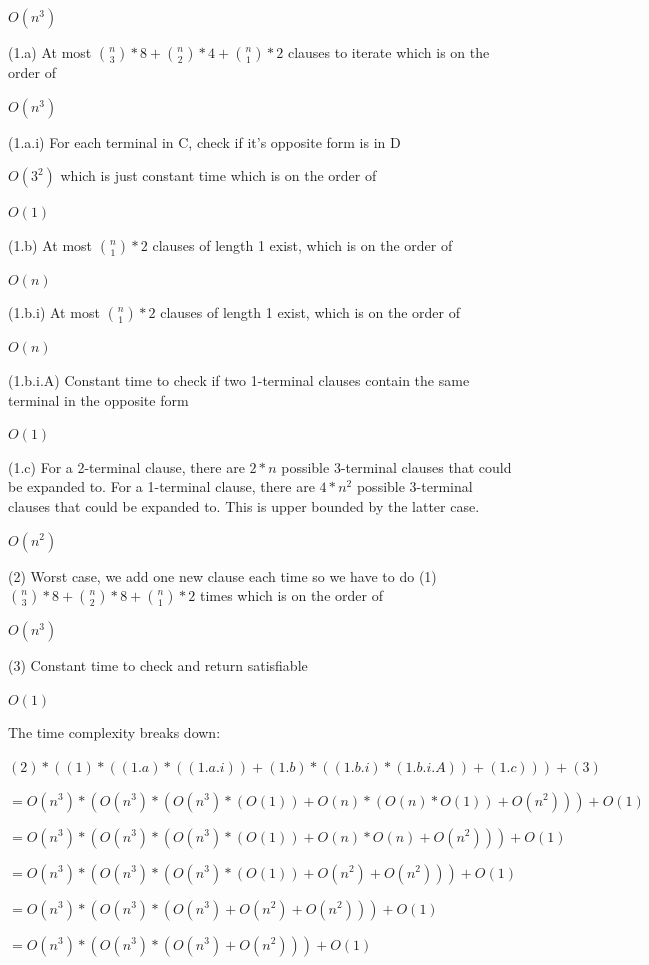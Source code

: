 \documentclass[manuscript]{acmart}
\begin{document}
    $O(n^3)$

    (1.a) At most ${\binom{n}{3}}*8 + {\binom{n}{2}}*4 + {\binom{n}{1}}*2$ clauses to iterate which is on the order of

    $O(n^3)$

    (1.a.i) For each terminal in C, check if it's opposite form is in D

    $O(3^2)$ which is just constant time which is on the order of 

    $O(1)$

    (1.b) At most ${\binom{n}{1}} * 2$ clauses of length 1 exist, which is on the order of

    $O(n)$

    (1.b.i) At most ${\binom{n}{1}} * 2$ clauses of length 1 exist, which is on the order of

    $O(n)$

    (1.b.i.A) Constant time to check if two 1-terminal clauses contain the same terminal in the opposite form

    $O(1)$

    (1.c) For a 2-terminal clause, there are $2*n$ possible 3-terminal clauses that could be 
    expanded to. For a 1-terminal clause, there are $4*n^2$ possible 3-terminal clauses that
    could be expanded to. This is upper bounded by the latter case.

    $O(n^2)$

    (2) Worst case, we add one new clause each time so we have to do (1) ${\binom{n}{3}} * 8 + {\binom{n}{2}} * 8 + {\binom{n}{1}} * 2$ times which is on the order of

    $O(n^3)$

    (3) Constant time to check and return satisfiable

    $O(1)$

    The time complexity breaks down:

    $(2) * ((1) * ((1.a) * ((1.a.i)) + (1.b) * ((1.b.i) * (1.b.i.A)) + (1.c))) + (3)$

    $= O(n^3) * (O(n^3) * (O(n^3) * (O(1)) + O(n) * (O(n) * O(1)) + O(n^2))) + O(1)$

    $= O(n^3) * (O(n^3) * (O(n^3) * (O(1)) + O(n) * O(n) + O(n^2))) + O(1)$

    $= O(n^3) * (O(n^3) * (O(n^3) * (O(1)) + O(n^2) + O(n^2))) + O(1)$

    $= O(n^3) * (O(n^3) * (O(n^3) + O(n^2) + O(n^2))) + O(1)$

    $= O(n^3) * (O(n^3) * (O(n^3) + O(n^2))) + O(1)$
\end{document}
